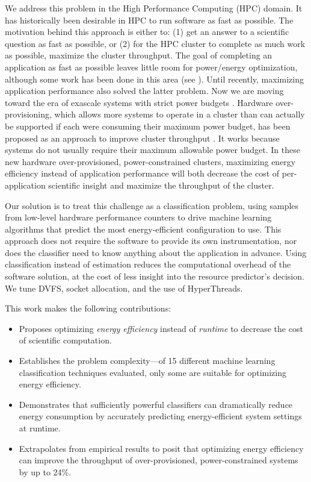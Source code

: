 We address this problem in the High Performance Computing (HPC) domain.
It has historically been desirable in HPC to run software as fast as possible.
The motivation behind this approach is either to: (1) get an answer to a scientific question as fast as possible, or (2) for the HPC cluster to complete as much work as possible, \ie maximize the cluster throughput.
The goal of completing an application as fast as possible leaves little room for power/energy optimization, although some work has been done in this area (see ).
Until recently, maximizing application performance also solved the latter problem.
Now we are moving toward the era of exascale systems with strict power budgets \cite{Exascale20MW}.
Hardware over-provisioning, which allows more systems to operate in a cluster than can actually be supported if each were consuming their maximum power budget, has been proposed as an approach to improve cluster throughput \cite{PatkiRMAP}.
It works because systems do not usually require their maximum allowable power budget.
In these new hardware over-provisioned, power-constrained clusters, maximizing energy efficiency instead of application performance will both decrease the cost of per-application scientific insight and maximize the throughput of the cluster.

Our solution is to treat this challenge as a classification problem, using samples from low-level hardware performance counters to drive machine learning algorithms that predict the most energy-efficient configuration to use.
This approach does not require the software to provide its own instrumentation, nor does the classifier need to know anything about the application in advance.
Using classification instead of estimation reduces the computational overhead of the software solution, at the cost of less insight into the resource predictor's decision.
We tune DVFS, socket allocation, and the use of HyperThreads.

This work makes the following contributions:
\begin{itemize}
\item Proposes optimizing \emph{energy efficiency} instead of \emph{runtime} to decrease the cost of scientific computation.
\item Establishes the problem complexity---of 15 different machine learning classification techniques evaluated, only some are suitable for optimizing energy efficiency.
\item Demonstrates that sufficiently powerful classifiers can dramatically reduce energy consumption by accurately predicting energy-efficient system settings at runtime.
\item Extrapolates from empirical results to posit that optimizing energy efficiency can improve the throughput of over-provisioned, power-constrained systems by up to 24\%.
\end{itemize}
